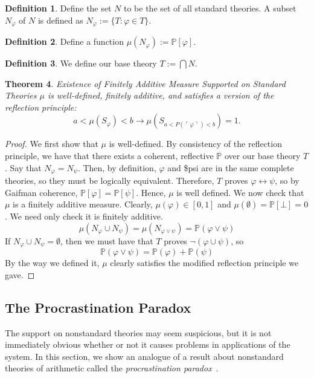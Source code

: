 \documentclass[12pt]{article}
\newcommand{\PP}{\mathbb{P}}
\theoremstyle{plain}
\newtheorem{theorem}{Theorem}[subsection]
\theoremstyle{definition}
\newtheorem{definition}[theorem]{Definition}
\theoremstyle{remark}
\begin{document}
\begin{definition}
Define the set $N$ to be the set of all standard theories. A subset $N_{\varphi}$ of $N$ is defined as $N_{\varphi}:=\{T:\varphi\in T\}$.
\end{definition}
\begin{definition}
Define a function $\mu(N_{\varphi}):=\PP[\varphi]$.
\end{definition}
\begin{definition}
We define our base theory $T:=\bigcap N$.
\end{definition}
\begin{theorem} \emph{Existence of Finitely Additive Measure Supported on Standard Theories}
$\mu$ is well-defined, finitely additive, and satisfies a version of the reflection principle:
$$a < \mu(S_{\varphi}) < b \rightarrow \mu(S_{a < P(\ulcorner \varphi \urcorner) < b}) = 1.$$
\end{theorem}
\begin{proof}
We first show that $\mu$ is well-defined. By consistency of the reflection principle, we have that there exists a coherent, reflective $\PP$ over our base theory $T$.
Say that $N_{\varphi}=N_{\psi}$. Then, by definition, $\varphi$ and \$psi are in the same complete theories, so they must be logically equivalent. Therefore, $T$ proves $\varphi\leftrightarrow\psi$, so by Gaifman coherence, $\PP[\varphi]=\PP[\psi]$. Hence, $\mu$ is well defined.
We now check that $\mu$ is a finitely additive measure. Clearly, $\mu(\varphi)\in[0,1]$ and $\mu(\emptyset)=\PP[\bot]=0$.
We need only check it is finitely additive. 
$$\mu(N_{\varphi}\cup N_{\psi})=\mu(N_{\varphi\vee\psi})=\PP(\varphi\vee\psi)$$
If $N_{\varphi}\cup N_{\psi}=\emptyset$, then we must have that $T$ proves $\neg(\varphi\cup\psi)$, so 
$$\PP(\varphi\vee\psi)=\PP(\varphi)+\PP(\psi)$$
By the way we defined it, $\mu$ clearly satisfies the modified reflection principle we gave.
\end{proof}
\subsection{The Procrastination Paradox}


The support on nonstandard theories may seem suspicious, but it is not immediately obvious whether or not it causes problems in applications of the system. In this section, we show an analogue of a result about nonstandard theories of arithmetic called the \emph{procrastination paradox}~\cite{yudkowsky13}. 
\end{document}
